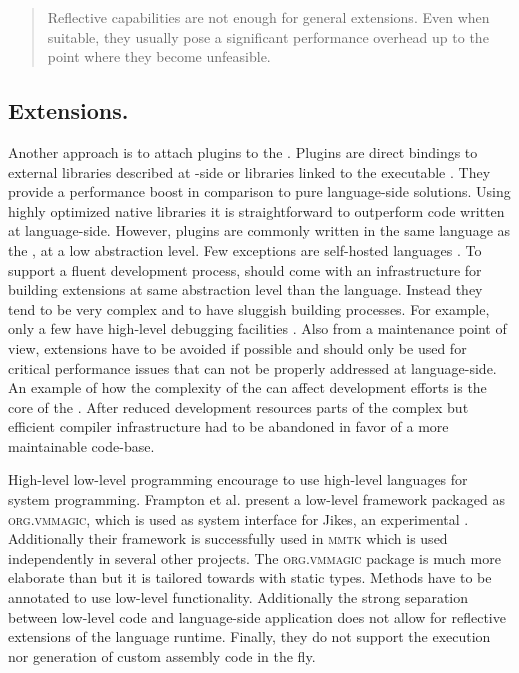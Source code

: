 \begin{quote}
Reflective capabilities are not enough for general extensions. Even when suitable, they usually pose a significant performance overhead up to the point where they become unfeasible.
\end{quote}

\subsection{\VM Extensions.}

Another approach is to attach plugins to the \VM.
Plugins are direct bindings to external libraries described at \VM-side or libraries linked to the \VM executable \cite[Ch.\ 5]{Blac09a}. 
They provide a performance boost in comparison to pure language-side solutions.
Using highly optimized native libraries it is straightforward to outperform code written at language-side.
However, plugins are commonly written in the same language as the \VM, at a low abstraction level.
Few exceptions are self-hosted languages \cite{Unga05a,Wimm13a,Rigo06a}.
To support a fluent development process, \VMs should come with an infrastructure for building extensions at same abstraction level than the language.
Instead they tend to be very complex and to have sluggish building processes. For example, only a few \VMs have high-level debugging facilities \cite{Inga97a,Unga05a,Wimm13a}.
Also from a \VM maintenance point of view, extensions have to be avoided if possible and should only be used for critical performance issues that can not be properly addressed at language-side.
An example of how the complexity of the \VM can affect development efforts is the core of the \Self \VM \cite{Unga07a}.
After reduced development resources parts of the complex but efficient compiler infrastructure had to be abandoned in favor of a more maintainable code-base.

High-level low-level programming \cite{Fram09a} encourage to use high-level languages for system programming.
Frampton et al. present a low-level framework packaged as \textsc{org.vmmagic}, which is used as system interface for Jikes, an experimental \Java \VM.
Additionally their framework is successfully used in \textsc{mmtk} \cite{Blac04a} which is used independently in several other projects.
The \textsc{org.vmmagic} package is much more elaborate than \B but it is tailored towards \Java with static types.
Methods have to be annotated to use low-level functionality.
Additionally the strong separation between low-level code and language-side application does not allow for reflective extensions of the language runtime.
Finally, they do not support the execution nor generation of custom assembly code in the fly.

